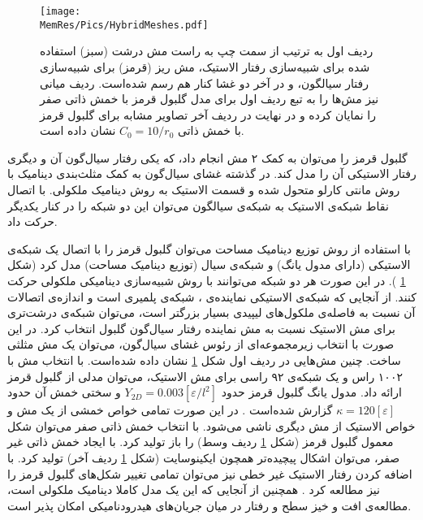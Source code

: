 \begin{figure}[htbp]
\begin{center}
\texttt{[image: \\MemRes/Pics/HybridMeshes.pdf]}
\caption{
ردیف اول به ترتیب از سمت چپ به راست مش‌ درشت (سبز)  استفاده شده برای شبیه‌سازی رفتار الاستیک، مش ریز (قرمز) برای شبیه‌سازی رفتار سیالگون، و در آخر دو غشا کنار هم رسم شده‌است. ردیف میانی نیز مش‌ها را به تبع ردیف اول برای 
مدل گلبول قرمز با خمش ذاتی صفر را نمایان کرده و در نهایت در ردیف آخر تصاویر مشابه برای گلبول قرمز با خمش ذاتی 
$C_0=10/r_0$
نشان داده است.
}
\label{fig:hybridMeshes}
\end{center}
\end{figure}

 گلبول قرمز را می‌توان به کمک ۲ مش انجام داد، که یکی رفتار سیال‌گون آن  و دیگری رفتار الاستیکی آن را مدل کند. در گذشته غشای سیال‌گون به کمک مثلث‌بندی دینامیک با روش مانتی کارلو متحول شده و قسمت الاستیک به روش دینامیک ملکولی. با اتصال نقاط شبکه‌ی الاستیک به شبکه‌ی سیالگون می‌توان این دو شبکه را در کنار یکدیگر حرکت داد. 

با استفاده از روش توزیع دینامیک مساحت می‌توان گلبول قرمز را با اتصال یک شبکه‌ی الاستیکی (دارای مدول یانگ) و شبکه‌ی سیال‌ (توزیع دینامیک مساحت) مدل کرد (شکل
\ref{fig:hybridMeshes}
).  در این صورت هر دو شبکه می‌توانند با روش شبیه‌سازی دینامیکی ملکولی حرکت کنند. از آنجایی که شبکه‌ی الاستیکی نماینده‌ی ، شبکه‌ی پلمیری است و اندازه‌ی اتصالات آن نسبت به فاصله‌ی ملکول‌های لیپیدی بسیار بزرگتر است، می‌توان شبکه‌ی درشت‌تری برای مش الاستیک نسبت به مش نماینده رفتار سیال‌گون گلبول انتخاب کرد. در این صورت با انتخاب زیرمجموعه‌ای از رئوس غشای سیال‌گون، می‌توان یک مش مثلثی ساخت. چنین مش‌هایی در ردیف اول شکل
\ref{fig:hybridMeshes}
نشان داده ‌شده‌است. با انتخاب مش با ۱۰۰۲ راس و یک شبکه‌ی ۹۲ راسی برای مش الاستیک، می‌توان مدلی از گلبول قرمز ارائه داد. مدول یانگ گلبول قرمز حدود 
$Y_{2D}=0.003 [\varepsilon/l^2]$
 و سختی خمش آن حدود
$\kappa=120 [\varepsilon]$ 
گزارش شده‌است
\cite{gomppernelson2012}
. در این صورت تمامی خواص خمشی از یک مش و خواص الاستیک از مش دیگری ناشی می‌شود. با انتخاب خمش ذاتی صفر می‌توان شکل معمول گلبول قرمز (شکل 
\ref{fig:hybridMeshes}
ردیف وسط) را باز تولید کرد. با ایجاد خمش ذاتی غیر صفر، می‌توان اشکال پیچیده‌تر همچون ایکینوسایت 
(شکل
\ref{fig:hybridMeshes}
ردیف آخر) تولید کرد. با اضافه کردن رفتار الاستیک غیر خطی نیز می‌توان تمامی تغییر شکل‌های گلبول قرمز را نیز مطالعه کرد
\cite{Lim2002PNAS, Noguchi2005PNAS}
. همچنین از آنجایی که این یک مدل کاملا دینامیک ملکولی‌ است، مطالعه‌ی افت و خیز سطح و رفتار در میان جریان‌های هیدرودنامیکی امکان پذیر است.






